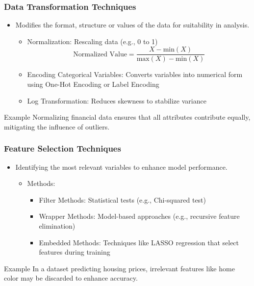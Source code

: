 \documentclass[aspectratio=169]{beamer}
\begin{document}
\begin{frame}[fragile]
    \frametitle{Data Transformation Techniques}
    \begin{itemize}
        \item Modifies the format, structure or values of the data for suitability in analysis.
        \begin{itemize}
            \item Normalization: Rescaling data (e.g., 0 to 1)
            \begin{equation}
                \text{Normalized Value} = \frac{X - \text{min}(X)}{\text{max}(X) - \text{min}(X)}
            \end{equation}
            \item Encoding Categorical Variables: Converts variables into numerical form using One-Hot Encoding or Label Encoding
            \item Log Transformation: Reduces skewness to stabilize variance
        \end{itemize}
    \end{itemize}
    \begin{block}{Example}
        Normalizing financial data ensures that all attributes contribute equally, mitigating the influence of outliers.
    \end{block}
\end{frame}

\begin{frame}[fragile]
    \frametitle{Feature Selection Techniques}
    \begin{itemize}
        \item Identifying the most relevant variables to enhance model performance.
        \begin{itemize}
            \item Methods:
            \begin{itemize}
                \item Filter Methods: Statistical tests (e.g., Chi-squared test)
                \item Wrapper Methods: Model-based approaches (e.g., recursive feature elimination)
                \item Embedded Methods: Techniques like LASSO regression that select features during training
            \end{itemize}
        \end{itemize}
    \end{itemize}
    \begin{block}{Example}
        In a dataset predicting housing prices, irrelevant features like home color may be discarded to enhance accuracy.
    \end{block}
\end{frame}
\end{document}
